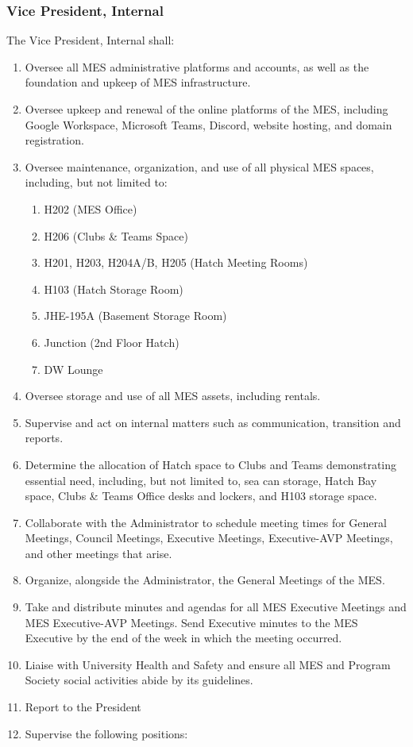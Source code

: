 \subsubsection{Vice President,
 Internal}
\label{vice-president-internal}
The Vice President, Internal shall:

\begin{enumerate}
 \item
  Oversee all MES administrative platforms and accounts, as well as the
  foundation and upkeep of MES infrastructure.
 \item
  Oversee upkeep and renewal of the online platforms of the MES,
  including Google Workspace, Microsoft Teams, Discord, website hosting,
  and domain registration.
 \item
  Oversee maintenance, organization, and use of all physical MES spaces,
  including, but not limited to:

  \begin{enumerate}
   \item
    H202 (MES Office)
   \item
    H206 (Clubs \& Teams Space)
   \item
    H201, H203, H204A/B, H205 (Hatch Meeting Rooms)
   \item
    H103 (Hatch Storage Room)
   \item
    JHE-195A (Basement Storage Room)
   \item
    Junction (2nd Floor Hatch)
   \item
    DW Lounge
  \end{enumerate}
 \item
  Oversee storage and use of all MES assets, including rentals.
 \item
  Supervise and act on internal matters such as communication,
  transition and reports.
 \item
  Determine the allocation of Hatch space to Clubs and Teams
  demonstrating essential need, including, but not limited to, sea can
  storage, Hatch Bay space, Clubs \& Teams Office desks and lockers, and
  H103 storage space.
 \item
  Collaborate with the Administrator to schedule meeting times for
  General Meetings, Council Meetings, Executive Meetings, Executive-AVP
  Meetings, and other meetings that arise.
 \item
  Organize, alongside the Administrator, the General Meetings of the
  MES.
 \item
  Take and distribute minutes and agendas for all MES Executive Meetings
  and MES Executive-AVP Meetings. Send Executive minutes to the MES
  Executive by the end of the week in which the meeting occurred.
 \item
  Liaise with University Health and Safety
  and ensure all MES and Program Society social activities abide by its guidelines.
 \item
  Report to the President
 \item
  Supervise the following positions:


\end{enumerate}
